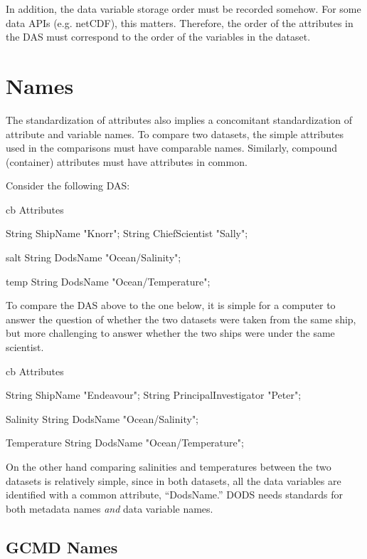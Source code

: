 \documentclass[10pt]{report}
\begin{document}
In addition, the data variable storage order must be recorded somehow.
For some data APIs (e.g. netCDF), this matters.  Therefore, the order
of the attributes in the DAS must correspond to the order of the
variables in the dataset.

\section{Names}
\label{sec:names}

The standardization of attributes also implies a concomitant
standardization of attribute and variable names.  To compare two
datasets, the simple attributes used in the comparisons must have
comparable names.  Similarly, compound (container) attributes must
have attributes in common.

Consider the following DAS:

\begin{code}{cb}
Attributes {
  String ShipName "Knorr";
  String ChiefScientist "Sally";

  salt {
    String DodsName "Ocean/Salinity";
  }

  temp {
    String DodsName "Ocean/Temperature";
  }
}
\end{code}

\noindent To compare the DAS above to the one below, it is simple 
for a computer to answer the question of whether the two datasets were
taken from the same ship, but more challenging to answer whether the
two ships were under the same scientist.

\begin{code}{cb}
Attributes {
  String ShipName "Endeavour";
  String PrincipalInvestigator "Peter";

  Salinity {
    String DodsName "Ocean/Salinity";
  }

  Temperature {
    String DodsName "Ocean/Temperature";
  }
}
\end{code}

\noindent On the other hand comparing salinities and temperatures 
between the two datasets is relatively simple, since in both datasets,
all the data variables are identified with a common attribute,
``DodsName.''  DODS needs standards for both metadata names \emph{and}
data variable names.

\subsection{GCMD Names}
\label{sec:gcmd-names}
\end{document}
